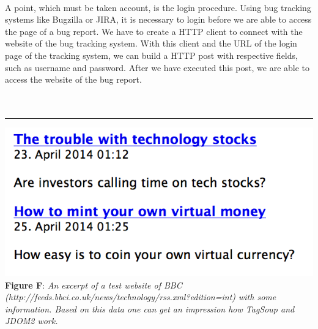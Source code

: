  \\ A point, which must be taken account, is the login procedure. Using bug tracking systems like Bugzilla or JIRA, it is necessary to login before we are able to access the page of a bug report. We have to create a HTTP client to connect with the website of the bug tracking system. With this client and the URL of the login page of the tracking system, we can build a HTTP post with respective fields, such as username and password. After we have executed this post, we are able to access the website of the bug report. \\ \\ \\ \hrule\includegraphics[width=1.0\textwidth]{website_ausschnitt.png} \\\textbf{Figure F}: \textit{An excerpt of a test website of BBC \\ (http://feeds.bbci.co.uk/news/technology/rss.xml?edition=int) with some information. Based on this data one can get an impression how TagSoup and JDOM2 work.}  \\ 